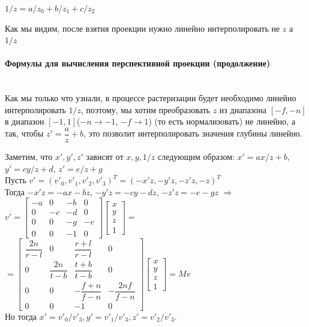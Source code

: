 \documentclass{article}
\begin{document}
$1/z = a / z_0 + b / z_1 + c / z_2$

Как мы видим, после взятия проекции нужно линейно интерполировать не $z$ а $1/z$

\paragraph{Формулы для вычисления перспективной проекции (продолжение)}
$\text{}$\\
Как мы только что узнали, в процессе растеризации будет необходимо линейно интерполировать $1/z$, поэтому, мы хотим преобразовать $z$ из диапазона $[-f, -n]$ в диапазон $[-1, 1]$($-n \to -1$, $-f \to 1$) (то есть нормализовать) не линейно, а так, чтобы $z'=\dfrac{a}{z}+b$, это позволит интерполировать значения глубины линейно.

Заметим, что $x', y', z'$ зависят от $x, y, 1/z$ следующим образом: $x'=ax/z + b$, $y'=cy/z+d$, $z'=e/z + g$ \\
Пусть $v' = (v'_0, v'_1, v'_2, v'_3)^T=(-x'z, -y'z, -z'z, -z)^T$ \\
Тогда $-x'z = -ax-bz$, $-y'z = -cy-dz$, $-z'z=-e-gz$ $\Rightarrow$ $v' = \begin{bmatrix}
-a & 0 & -b & 0 \\
0 & -c & -d & 0 \\
0 & 0 & -g & -e \\
0 & 0 & -1 & 0
\end{bmatrix} \begin{bmatrix}
x \\ y \\ z \\ 1
\end{bmatrix} = $\\
$=
\begin{bmatrix}
\dfrac{2n}{r-l} & 0 & \dfrac{r+l}{r-l} & 0 \\
0 & \dfrac{2n}{t-b} & \dfrac{t+b}{t-b} & 0 \\
0 & 0 & -\dfrac{f+n}{f-n} & -\dfrac{2nf}{f-n} \\
0 & 0 & -1 & 0
\end{bmatrix} \begin{bmatrix}
x \\ y \\ z \\ 1
\end{bmatrix} =
M v$ \\
Но тогда $x'=v'_0 / v'_3, y' = v'_1 / v'_3, z' = v'_2 / v'_3$.
\end{document}
